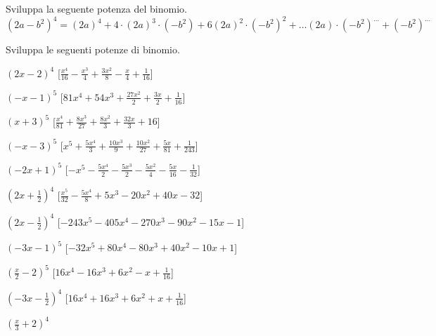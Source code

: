 \subsubsection*{}

\begin{esercizio}
 \label{ese:11.28}
 Sviluppa la seguente potenza del binomio.
 \[\left(2a-b^{2}\right)^{4}=\left(2a\right)^{4}+4\cdot
\left(2a\right)^{3}\cdot \left(-b^{2}\right)+6\left(2a\right)^{2}\cdot
\left(-b^{2}\right)^{2}+\ldots \left(2a\right)\cdot
\left(-b^{2}\right)^{\ldots }+\left(-b^{2}\right)^{\ldots }\]
\end{esercizio}

\begin{esercizio}
 \label{ese:11.29}
 Sviluppa le seguenti potenze di binomio.
 \begin{enumeratea}
 \spazielenx
\item \(\left(2 x - 2\right)^{4}\)
  \hfill [\(\frac{x^{4}}{16} - \frac{x^{3}}{4} + \frac{3 x^{2}}{8} - 
\frac{x}{4} + \frac{1}{16}\)]
\item \(\left(- x - 1\right)^{5}\)
  \hfill [\(81 x^{4} + 54 x^{3} + \frac{27 x^{2}}{2} + \frac{3 x}{2} + 
\frac{1}{16}\)]
\item \(\left(x + 3\right)^{5}\)
  \hfill [\(\frac{x^{4}}{81} + \frac{8 x^{3}}{27} + \frac{8 x^{2}}{3} + 
\frac{32 x}{3} + 16\)]
\item \(\left(- x - 3\right)^{5}\)
  \hfill [\(x^{5} + \frac{5 x^{4}}{3} + \frac{10 x^{3}}{9} + \frac{10 
x^{2}}{27} + \frac{5 x}{81} + \frac{1}{243}\)]
\item \(\left(- 2 x + 1\right)^{5}\)
  \hfill [\(- x^{5} - \frac{5 x^{4}}{2} - \frac{5 x^{3}}{2} - \frac{5 
x^{2}}{4} - \frac{5 x}{16} - \frac{1}{32}\)]
\item \(\left(2 x + \frac{1}{2}\right)^{4}\)
  \hfill [\(\frac{x^{5}}{32} - \frac{5 x^{4}}{8} + 5 x^{3} - 20 x^{2} + 40 
x - 32\)]
\item \(\left(2 x - \frac{1}{2}\right)^{4}\)
  \hfill [\(- 243 x^{5} - 405 x^{4} - 270 x^{3} - 90 x^{2} - 15 x - 1\)]
\item \(\left(- 3 x - 1\right)^{5}\)
  \hfill [\(- 32 x^{5} + 80 x^{4} - 80 x^{3} + 40 x^{2} - 10 x + 1\)]
\item \(\left(\frac{x}{2} - 2\right)^{5}\)
  \hfill [\(16 x^{4} - 16 x^{3} + 6 x^{2} - x + \frac{1}{16}\)]
\item \(\left(- 3 x - \frac{1}{2}\right)^{4}\)
  \hfill [\(16 x^{4} + 16 x^{3} + 6 x^{2} + x + \frac{1}{16}\)]
\item \(\left(\frac{x}{3} + 2\right)^{4}\)

\end{enumeratea}
\end{esercizio}
